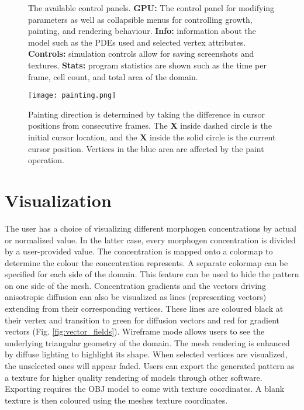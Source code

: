 \begin{figure}[ht]
	\centering
	\caption{The available control panels. \textbf{GPU:} The control panel for modifying parameters as well as collapsible menus for controlling growth, painting, and rendering behaviour. \textbf{Info:} information about the model such as the PDEs used and selected vertex attributes. \textbf{Controls:} simulation controls allow for saving screenshots and textures. \textbf{Stats:} program statistics are shown such as the time per frame, cell count, and total area of the domain.} 
	\label{fig:GUIexample}
\end{figure}

\begin{figure}[ht]
	\centering
	\texttt{[image: painting.png]}	
	\caption{Painting direction is determined by taking the difference in cursor positions from consecutive frames. The \textbf{X} inside dashed circle is the initial cursor location, and the \textbf{X} inside the solid circle is the current cursor position. Vertices in the blue area are affected by the paint operation.} 
	\label{fig:painting}
\end{figure}

\section{Visualization}
The user has a choice of visualizing different morphogen concentrations by actual or normalized value. In the latter case, every morphogen concentration is divided by a user-provided value. The concentration is mapped onto a colormap to determine the colour the concentration represents. A separate colormap can be specified for each side of the domain. This feature can be used to hide the pattern on one side of the mesh. Concentration gradients and the vectors driving anisotropic diffusion can also be visualized as lines (representing vectors) extending from their corresponding vertices. These lines are coloured black at their vertex and transition to green for diffusion vectors and red for gradient vectors (Fig. \ref{fig:vector_fields}). Wireframe mode allows users to see the underlying triangular geometry of the domain. The mesh rendering is enhanced by diffuse lighting to highlight its shape. When selected vertices are visualized, the unselected ones will appear faded. Users can export the generated pattern as a texture for higher quality rendering of models through other software. Exporting requires the OBJ model to come with texture coordinates. A blank texture is then coloured using the meshes texture coordinates.

